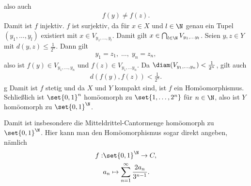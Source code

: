 \begin{beweis}
\begin{align*}
\end{align*}
also auch 
\begin{align*}
  f(y) \neq f(z).
\end{align*}
Damit ist $f$ injektiv. $f$ ist surjektiv, da für $x \in X$ und $l \in \N$ genau ein Tupel $(y_1, \dots, y_l)$ existiert mit $x \in V_{y_1, \dots, y_l}$. Damit gilt $x \in \bigcap_{l \in \N} V_{y_1, \dots y_l}$. 
Seien $y, z \in Y$ mit $d(y, z) \leq \frac 1 {2^n}$. Dann gilt 
\begin{align*}
 y_1 = z_1,\; \dots,\; y_n = z_n, 
\end{align*}
also ist $f(y) \in V_{y_1, \dots, y_n}$ und $f(z) \in V_{y_1, \dots y_n}$. Da $\diam(V_{y_1, \dots, y_n})< \frac 1 {2^n}$, gilt auch 
\begin{align*}
  d(f(y), f(z))< \frac 1 {2^n}.
\end{align*}g
Damit ist $f$ stetig und da $X$ und $Y$ kompakt sind, ist $f$ ein Homöomorphismus. Schließlich ist $\set{0,1}^n$ homöomorph zu $\set{1, \dots, 2^n}$ für $n \in \N$, also ist $Y$ homöomorph zu $\set{0,1}^\N$.
\end{beweis}
Damit ist insbesondere die Mitteldrittel-Cantormenge homöomorph zu $\set{0,1}^\N$. Hier kann man den Homöomorphismus sogar direkt angeben, nämlich 
\begin{align*}
  f:& \set {0,1}^\N \to C,\\
  &a_n \mapsto \sum_{n = 1}^\infty \frac {2a_n}{3^{n-1}}.
\end{align*}


